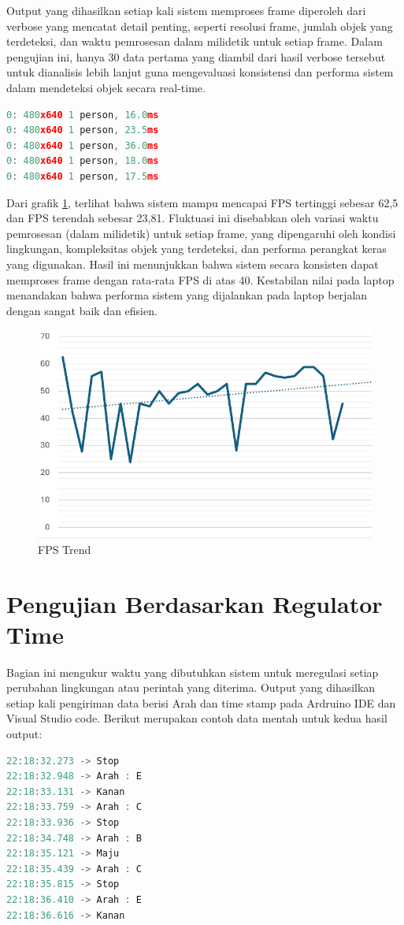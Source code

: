 Output yang dihasilkan setiap kali sistem memproses frame diperoleh dari verbose yang mencatat detail penting, seperti resolusi frame, jumlah objek yang terdeteksi, dan waktu pemrosesan dalam milidetik untuk setiap frame. Dalam pengujian ini, hanya 30 data pertama yang diambil dari hasil verbose tersebut untuk dianalisis lebih lanjut guna mengevaluasi konsistensi dan performa sistem dalam mendeteksi objek secara real-time.

\begin{lstlisting}[language=c]
0: 480x640 1 person, 16.0ms
0: 480x640 1 person, 23.5ms
0: 480x640 1 person, 36.0ms
0: 480x640 1 person, 18.0ms
0: 480x640 1 person, 17.5ms
\end{lstlisting}

Dari grafik \ref{fig:fps_trend}, terlihat bahwa sistem mampu mencapai FPS tertinggi sebesar 62,5 dan FPS terendah sebesar 23,81. Fluktuasi ini disebabkan oleh variasi waktu pemrosesan (dalam milidetik) untuk setiap frame, yang dipengaruhi oleh kondisi lingkungan, kompleksitas objek yang terdeteksi, dan performa perangkat keras yang digunakan.
Hasil ini menunjukkan bahwa sistem secara konsisten dapat memproses frame dengan rata-rata FPS di atas 40. Kestabilan nilai pada laptop menandakan bahwa performa sistem yang dijalankan pada laptop berjalan dengan sangat baik dan efisien.

\begin{figure}[H]
    \centering
    \includegraphics[width=.6\textwidth]{gambar/tex/fps.pdf}
    \caption{FPS Trend}
    \label{fig:fps_trend}
\end{figure}

\newpage
\section{Pengujian Berdasarkan Regulator Time}
\label{sec:pengujianberdasarkanregulatorsetime}

Bagian ini mengukur waktu yang dibutuhkan sistem untuk meregulasi setiap perubahan lingkungan atau perintah yang diterima.
Output yang dihasilkan setiap kali pengiriman data berisi Arah dan time stamp pada Ardruino IDE dan Visual Studio code. Berikut merupakan contoh data mentah untuk kedua hasil output: 
\begin{lstlisting}[language=c]
22:18:32.273 -> Stop
22:18:32.948 -> Arah : E
22:18:33.131 -> Kanan
22:18:33.759 -> Arah : C
22:18:33.936 -> Stop
22:18:34.748 -> Arah : B
22:18:35.121 -> Maju
22:18:35.439 -> Arah : C
22:18:35.815 -> Stop
22:18:36.410 -> Arah : E
22:18:36.616 -> Kanan
\end{lstlisting}


